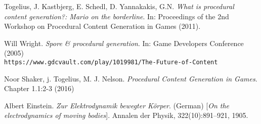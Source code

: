 

\begin{thebibliography}{9}

 Togelius, J. Kastbjerg, E. Schedl, D. Yannakakis, G.N. \textit{What is procedural content generation?: Mario on the borderline}.  In: Proceedings of the 2nd Workshop on Procedural Content Generation in Games (2011).

 Will Wright. \textit{Spore \& procedural generation}. In: Game Developers Conference (2005) \\\texttt{https://www.gdcvault.com/play/1019981/The-Future-of-Content}
 
 Noor Shaker, j. Togelius, M. J. Nelson. \textit{Procedural Content Generation in Games}. Chapter 1.1:2-3 (2016)

Albert Einstein. 
\textit{Zur Elektrodynamik bewegter K{\"o}rper}. (German) 
[\textit{On the electrodynamics of moving bodies}]. 
Annalen der Physik, 322(10):891–921, 1905.

\end{thebibliography}